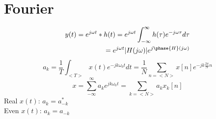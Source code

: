 \documentclass[twocolumn]{article}
\begin{document}
\section*{Fourier}
\begin{align*}
    y(t)=e^{j\omega t}*h(t)=e^{j\omega t}\int_{-\infty}^{\infty}h(\tau)e^{-j\omega \tau}d\tau \\
    =e^{j\omega t}|H(j\omega)|e^{j\phase{H}(j\omega)}
\end{align*}
\begin{equation*}
    a_k = \frac{1}{T} \int_{<T>} x(t) e^{-jk\omega_0 t} dt = \frac{1}{N} \sum_{n=<N>}x[n]e^{-jk\frac{2\pi}{N} n}
\end{equation*}
\begin{equation*}
    x=\sum_{-\infty}^{\infty}a_ke^{jk\omega_0t} = \sum_{k=<N>}a_k x_k[n]
\end{equation*}
Real $x(t)$: $a_k=a^*_{-k}$\\
Even $x(t)$: $a_k=a_{-k}$
\end{document}
